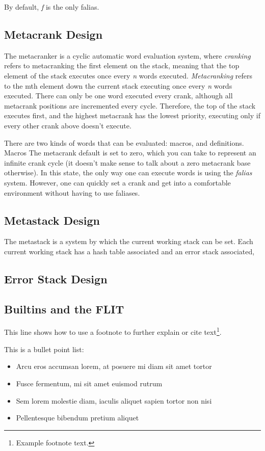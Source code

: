 \documentclass[
	a4paper, %
	10pt, %
	twoside, %
]{LTJournalArticle}
\begin{document}
By default, \emph{f} is the only falias.
\subsection{Metacrank Design}
The metacranker is a cyclic automatic word evaluation system, where \emph{cranking} refers to metacranking the first
element on the stack, meaning that the top element of the stack executes once every \emph{n} words executed. \emph{Metacranking}
refers to the mth element down the current stack executing once every \emph{n} words executed. There can only be one word
executed every crank, although all metacrank positions are incremented every cycle. Therefore, the top of the stack executes
first, and the highest metacrank has the lowest priority, executing only if every other crank above doesn't execute.

There are two kinds of words that can be evaluated: macros, and definitions. Macros
The metacrank default is set to zero, which you can take to represent an infinite crank cycle (it doesn't make sense to talk
about a zero metacrank base otherwise). In this state, the only way one can execute words is using the \emph{falias} system.
However, one can quickly set a crank and get into a comfortable environment without having to use faliases.
\subsection{Metastack Design}
The metastack is a system by which the current working stack can be set. Each current working stack has a hash table associated
and an error stack associated,
\subsection{Error Stack Design}

\subsection{Builtins and the FLIT}

This line shows how to use a footnote to further explain or cite text\footnote{Example footnote text.}.

This is a bullet point list:

\begin{itemize}
	\item Arcu eros accumsan lorem, at posuere mi diam sit amet tortor
	\item Fusce fermentum, mi sit amet euismod rutrum
	\item Sem lorem molestie diam, iaculis aliquet sapien tortor non nisi
	\item Pellentesque bibendum pretium aliquet
\end{itemize}
\end{document}
